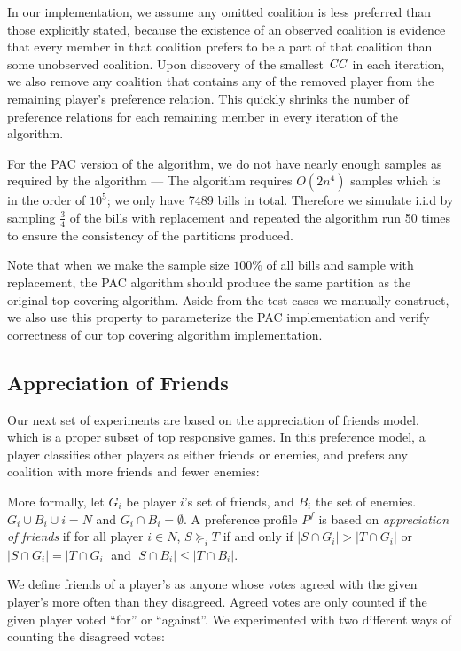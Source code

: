 In our implementation, we assume any omitted coalition is less preferred
than those explicitly stated, because the existence of an observed
coalition is evidence that every member in that coalition prefers to be
a part of that coalition than some unobserved coalition.
Upon discovery of the smallest $\mathit{CC}$ in each iteration, we also remove any coalition that contains any of the removed player from the remaining player's preference relation. This quickly shrinks the number of preference relations for each remaining member in every iteration of the algorithm.

For the PAC version of the algorithm, we do not have nearly enough samples
as required by the algorithm --- The algorithm requires $O(2n^4)$ samples
which is in the order of $10^5$; we only have 7489 bills in total.
Therefore we simulate i.i.d by sampling $\frac{3}{4}$ of the bills
with replacement and repeated the algorithm run 50 times to ensure
the consistency of the partitions produced.

Note that when we make the sample size $100\%$ of all bills and sample
with replacement, the PAC algorithm should produce the same partition
as the original top covering algorithm.
Aside from the test cases we manually construct, we also use this property to parameterize the PAC implementation and verify correctness of
our top covering algorithm implementation.


\subsection{Appreciation of Friends}
\label{subsec:appreciation_of_friends}

Our next set of experiments are based on the appreciation of friends model,
which is a proper subset of top responsive games.
In this preference model, a player classifies other players as either friends
or enemies, and prefers any coalition with more friends and fewer enemies:

More formally, let $G_i$ be player $i$'s set of friends, and $B_i$ the set of enemies. $G_i \cup B_i \cup i = N$ and $G_i \cap B_i = \emptyset$. A preference profile $P^f$ is based on \textit{appreciation of friends} if for all player $i \in N$, $S \succeq_i T$ if and only if $|S \cap G_i| > |T \cap G_i|$ or $|S \cap G_i| = |T \cap G_i|$ and $|S \cap B_i| \leq |T \cap B_i|$.

We define friends of a player's as anyone whose votes agreed with the given
player's more often than they disagreed.
Agreed votes are only counted if the given player voted ``for'' or ``against''.
We experimented with two different ways of counting the disagreed votes:

